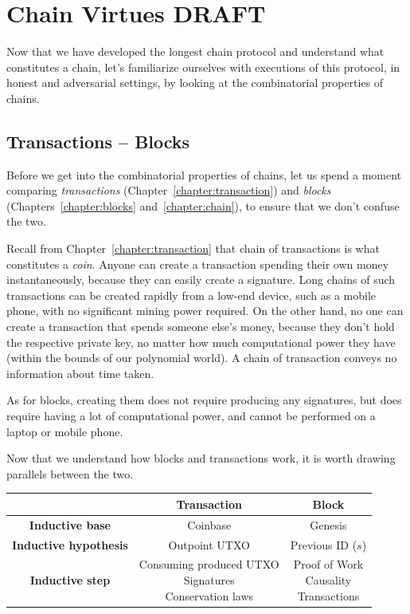 \chapter{Chain Virtues \small{\textsf{DRAFT}}}\label{chapter:virtues}

Now that we have developed the longest chain protocol and understand
what constitutes a chain, let's familiarize ourselves with executions
of this protocol, in honest and adversarial settings, by looking at
the combinatorial properties of chains.

\section{Transactions -- Blocks}

Before we get into the combinatorial properties of chains, let us spend a moment
comparing \emph{transactions} (Chapter~\ref{chapter:transaction}) and \emph{blocks}
(Chapters~\ref{chapter:blocks} and~\ref{chapter:chain}), to ensure
that we don't confuse the two.

Recall from Chapter~\ref{chapter:transaction} that chain of transactions is what constitutes
a \emph{coin}. Anyone can create a transaction spending their own money instantaneously, because
they can easily create a signature. Long chains of such transactions can be created rapidly
from a low-end device, such as a mobile phone, with no significant mining power required.
On the other hand, no one can create a transaction that spends someone else's money,
because they don't hold the respective private key, no matter how much computational
power they have (within the bounds of our polynomial world). A chain of transaction
conveys no information about time taken.

As for blocks, creating them does not require producing any signatures, but does require
having a lot of computational power, and cannot be performed on a laptop or mobile phone.

Now that we understand how blocks and transactions work, it is worth drawing parallels between the two.
\begin{center}
\begin{tabular}{ |c|c|c| }
  \hline
  & \textbf{Transaction} & \textbf{Block} \\
  \hline
  \textbf{Inductive base} & Coinbase & Genesis \\
  \hline
  \textbf{Inductive hypothesis} & Outpoint UTXO & Previous ID ($s$) \\
  \hline
  \textbf{Inductive step} & \makecell{Consuming produced UTXO \\ Signatures \\ Conservation laws} & \makecell{Proof of Work \\ Causality \\ Transactions} \\
  \hline
\end{tabular}
\end{center}


